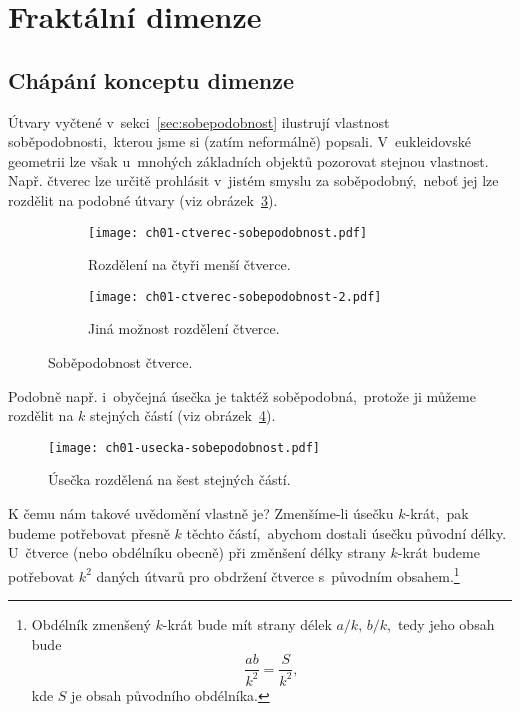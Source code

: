 \section{Fraktální dimenze}\label{sec:fraktalni_dimenze}

\subsection{Chápání konceptu dimenze}\label{subsec:koncept-dimenze}

Útvary vyčtené v~sekci~\ref{sec:sobepodobnost} ilustrují vlastnost soběpodobnosti,~kterou jsme si (zatím neformálně) popsali. V~eukleidovské geometrii lze však u~mnohých základních objektů pozorovat stejnou vlastnost. Např. čtverec lze určitě prohlásit v~jistém smyslu za soběpodobný,~neboť jej lze rozdělit na podobné útvary (viz obrázek~\ref{fig:sobepodobnost-ctverce}).
\begin{figure}[h]
    \centering
    \begin{subfigure}[b]{\subfigwidth}
        \centering
        \texttt{[image: ch01-ctverec-sobepodobnost.pdf]}
        \caption{Rozdělení na čtyři menší čtverce.}
        \label{subfig:sobepodobnost-ctverce-1}
    \end{subfigure}
    \begin{subfigure}[b]{\subfigwidth}
        \centering
        \texttt{[image: ch01-ctverec-sobepodobnost-2.pdf]}
        \caption{Jiná možnost rozdělení čtverce.}
        \label{subfig:sobepodobnost-ctverce-2}
    \end{subfigure}
    \caption{Soběpodobnost čtverce.}
    \label{fig:sobepodobnost-ctverce}
\end{figure}
Podobně např. i~obyčejná úsečka je taktéž soběpodobná,~protože ji můžeme rozdělit na $k$ stejných částí (viz obrázek~\ref*{fig:sobepodobnost-usecky}).\par
\begin{figure}[h]
    \centering
    \texttt{[image: ch01-usecka-sobepodobnost.pdf]}
    \caption{Úsečka rozdělená na šest stejných částí.}
    \label{fig:sobepodobnost-usecky}
\end{figure}
K čemu nám takové uvědomění vlastně je? Zmenšíme-li úsečku $k$-krát,~pak budeme potřebovat přesně $k$ těchto částí,~abychom dostali úsečku původní délky. U~čtverce (nebo obdélníku obecně) při změnšení délky strany $k$-krát budeme potřebovat $k^2$ daných útvarů pro obdržení čtverce s~původním obsahem.\footnote{Obdélník zmenšený $k$-krát bude mít strany délek $a/k,\,b/k$,~tedy jeho obsah bude
\[\dfrac{ab}{k^2}=\dfrac{S}{k^2},\]
kde $S$ je obsah původního obdélníka.}

